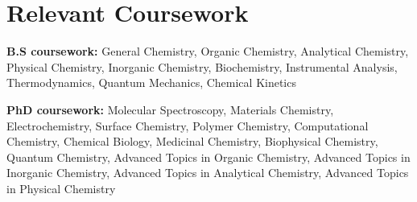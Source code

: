 \documentclass[letterpaper,11pt]{article}
\makeatletter
\newcommand{\resumeOrganizationHeading}[4]{
	\vspace{-2pt}\item
	\begin{tabular*}{0.97\textwidth}[t]{l@{\extracolsep{\fill}}r}
		\textbf{#1} & \textit{\small #2} \\
		\textit{\small#3}
	\end{tabular*}\vspace{-7pt}
}
\newcommand{\resumeSubHeadingListStart}{\begin{itemize}[leftmargin=0.15in, label={}]}
\newcommand{\resumeSubHeadingListEnd}{\end{itemize}}
\makeatother
\begin{document}
	
	
	
	\section{\textbf{\color{red}Relevant Coursework}}
	\vspace{2pt}
	\resumeSubHeadingListStart
	\small{\item{
			\textbf{B.S coursework:}{ 
				General Chemistry,
				Organic Chemistry,
				Analytical Chemistry,
				Physical Chemistry,
				Inorganic Chemistry,
				Biochemistry,
				Instrumental Analysis,
				Thermodynamics,
				Quantum Mechanics,
				Chemical Kinetics} \\ \vspace{3pt}
			
			\textbf{PhD coursework:}{
				Molecular Spectroscopy,
				Materials Chemistry,
				Electrochemistry,
				Surface Chemistry,
				Polymer Chemistry,
				Computational Chemistry,
				Chemical Biology,
				Medicinal Chemistry,
				Biophysical Chemistry,
				Quantum Chemistry,
				Advanced Topics in Organic Chemistry,
				Advanced Topics in Inorganic Chemistry,
				Advanced Topics in Analytical Chemistry,
				Advanced Topics in Physical Chemistry} \\ \vspace{3pt}
			
	}}
	\resumeSubHeadingListEnd
	
	
	
	
	
	
	
	
	
	
	
	
\end{document}
